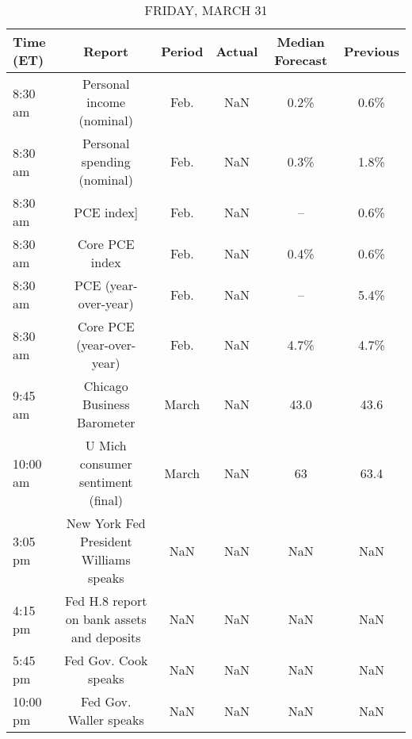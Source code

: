 \documentclass{article}%
\begin{document}
%


\begin{table}[htbp]%
\caption{FRIDAY, MARCH 31}%
\centering%
\begin{adjustbox}{width=1\textwidth}%
\begin{tabular}{lccccc}
\toprule
Time (ET) &                                     Report & Period & Actual & Median Forecast & Previous \\
\midrule
  8:30 am &                  Personal income (nominal) &   Feb. &    NaN &            0.2\% &     0.6\% \\
  8:30 am &                Personal spending (nominal) &   Feb. &    NaN &            0.3\% &     1.8\% \\
  8:30 am &                                 PCE index] &   Feb. &    NaN &              -- &     0.6\% \\
  8:30 am &                             Core PCE index &   Feb. &    NaN &            0.4\% &     0.6\% \\
  8:30 am &                       PCE (year-over-year) &   Feb. &    NaN &              -- &     5.4\% \\
  8:30 am &                  Core PCE (year-over-year) &   Feb. &    NaN &            4.7\% &     4.7\% \\
  9:45 am &                 Chicago Business Barometer &  March &    NaN &            43.0 &     43.6 \\
 10:00 am &          U Mich consumer sentiment (final) &  March &    NaN &              63 &     63.4 \\
  3:05 pm &     New York Fed President Williams speaks &    NaN &    NaN &             NaN &      NaN \\
  4:15 pm & Fed H.8 report on bank assets and deposits &    NaN &    NaN &             NaN &      NaN \\
  5:45 pm &                       Fed Gov. Cook speaks &    NaN &    NaN &             NaN &      NaN \\
 10:00 pm &                     Fed Gov. Waller speaks &    NaN &    NaN &             NaN &      NaN \\
\bottomrule
\end{tabular}
%
\end{adjustbox}%
\end{table}
\end{document}
